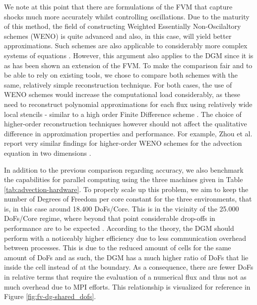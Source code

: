 \documentclass[asi,article,submit,moreauthors]{Definitions/mdpi}
\begin{document}
We note at this point that there are formulations of the FVM that capture shocks much more accurately whilst controlling oscillations.
Due to the maturity of this method, the field of constructing Weighted Essentially Non-Oscilaltory schemes (WENO) is quite advanced and also, in this case, will yield better approximations.
Such schemes are also applicable to considerably more complex systems of equations \cite{zimbrodEfficientSimulationComplex2022}.
However, this argument also applies to the DGM since it is as has been shown an extension of the FVM.
To make the comparison fair and to be able to rely on existing tools, we chose to compare both schemes with the same, relatively simple reconstruction technique.
For both cases, the use of WENO schemes would increase the computational load considerably, as these need to reconstruct polynomial approximations for each flux using relatively wide local stencils - similar to a high order Finite Difference scheme \cite{liuRobustReconstructionUnstructured2013}.
The choice of higher-order reconstruction techniques however should not affect the qualitative difference in approximation properties and performance.
For example, Zhou et al. report very similar findings for higher-order WENO schemes for the advection equation in two dimensions \cite{zhouNumericalComparisonWENO2001}.

In addition to the previous comparison regarding accuracy, we also benchmark the capabilities for parallel computing using the three machines given in Table \ref{tab:advection-hardware}.
To properly scale up this problem, we aim to keep the number of Degrees of Freedom per core constant for the three environments, that is,  in this case around 18.400 DoFs/Core.
This is in the vicinity of the 25.000 DoFs/Core regime, where beyond that point considerable drop-offs in performance are to be expected \cite{badiaGenericFiniteElement2020}.
According to the theory, the DGM should perform with a noticeably higher efficiency due to less communication overhead between processes.
This is due to the reduced amount of cells for the same amount of DoFs and as such, the DGM has a much higher ratio of DoFs that lie inside the cell instead of at the boundary. 
As a consequence, there are fewer DoFs in relative terms that require the evaluation of a numerical flux and thus not as much overhead due to MPI efforts.
This relationship is visualized for reference in Figure \ref{fig:fv-dg-shared_dofs}.
\end{document}
